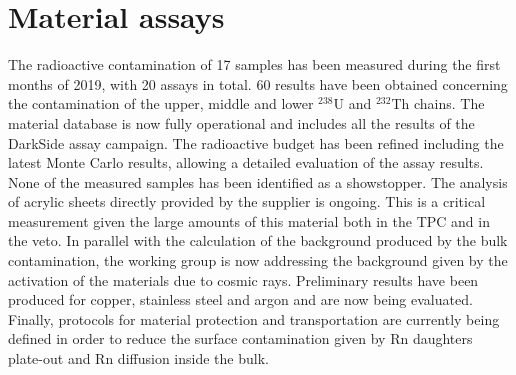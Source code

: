 \section{Material assays}
\label{sec:Materials}



The radioactive contamination of 17 samples has been measured during the first months of 2019, with 20 assays in total. 60 results have been obtained concerning the contamination of the upper, middle and lower $^{238}$U and $^{232}$Th chains. The material database is now fully operational and includes all the  results of the DarkSide assay campaign.  The radioactive budget has been refined including the latest Monte Carlo results, allowing a detailed evaluation of the assay results. None of the measured samples has been identified as a showstopper. The analysis  of acrylic sheets directly provided by the supplier  is ongoing. This is a critical measurement given the large amounts of this material both in the TPC and in the veto.
In parallel with the  calculation of the background produced by the  bulk contamination, the working group is now addressing the background given by the  activation  of the materials due to cosmic rays. Preliminary results have been produced for copper, stainless steel and argon and are now being evaluated. Finally, protocols for material protection and transportation are currently being defined in order to reduce the surface contamination given by Rn daughters plate-out  and Rn diffusion inside the bulk.

